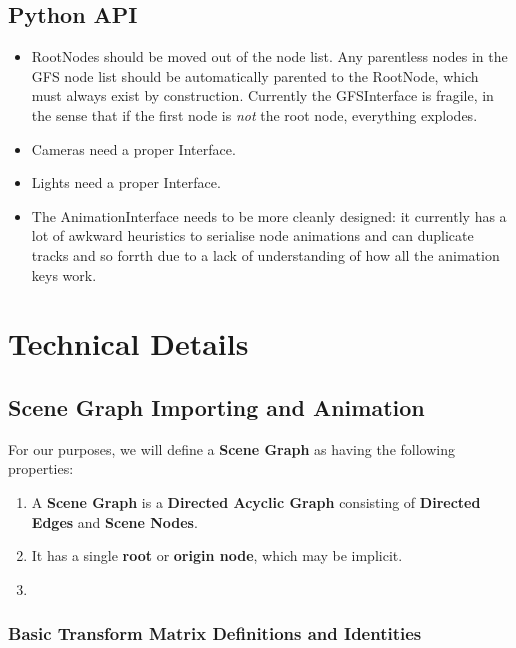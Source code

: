 \documentclass{article}
\begin{document}
\subsection{Python API}
\begin{itemize}
\item RootNodes should be moved out of the node list. Any parentless nodes in the GFS node list should be automatically parented to the RootNode, which must always exist by construction. Currently the GFSInterface is fragile, in the sense that if the first node is \textit{not} the root node, everything explodes.
\item Cameras need a proper Interface.
\item Lights need a proper Interface.
\item The AnimationInterface needs to be more cleanly designed: it currently has a lot of awkward heuristics to serialise node animations and can duplicate tracks and so forrth due to a lack of understanding of how all the animation keys work.
\end{itemize}

\clearpage

\section{Technical Details}
\subsection{Scene Graph Importing and Animation}

For our purposes, we will define a \textbf{Scene Graph} as having the following properties:
\begin{enumerate}
\item A \textbf{Scene Graph} is a \textbf{Directed Acyclic Graph} consisting of \textbf{Directed Edges} and \textbf{Scene Nodes}.
\item It has a single \textbf{root} or \textbf{origin node}, which may be implicit.
\item 
\end{enumerate}


\subsubsection{Basic Transform Matrix Definitions and Identities}
\end{document}
